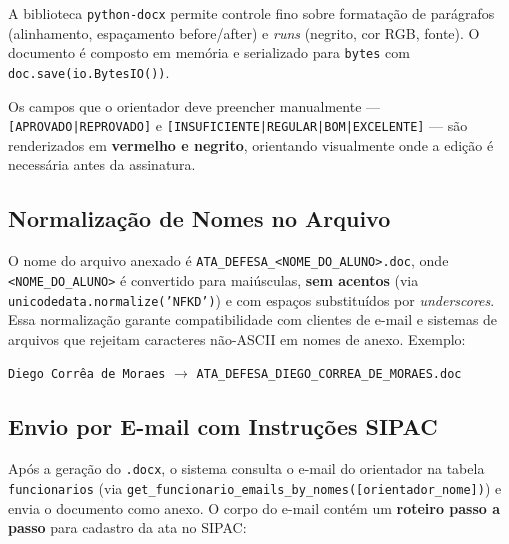 \documentclass[12pt,a4paper]{report}
\begin{document}
A biblioteca \texttt{python-docx} permite controle fino sobre formatação de
parágrafos (alinhamento, espaçamento before/after) e \textit{runs} (negrito,
cor RGB, fonte). O documento é composto em memória e serializado para
\texttt{bytes} com \texttt{doc.save(io.BytesIO())}.

\begin{insight}[title=Campos editáveis destacados em vermelho]
Os campos que o orientador deve preencher manualmente ---
\texttt{[APROVADO|REPROVADO]} e \texttt{[INSUFICIENTE|REGULAR|BOM|EXCELENTE]}
--- são renderizados em \textbf{vermelho e negrito}, orientando visualmente
onde a edição é necessária antes da assinatura.
\end{insight}

\subsection{Normalização de Nomes no Arquivo}

O nome do arquivo anexado é \texttt{ATA\_DEFESA\_<NOME\_DO\_ALUNO>.doc}, onde
\texttt{<NOME\_DO\_ALUNO>} é convertido para maiúsculas, \textbf{sem acentos}
(via \texttt{unicodedata.normalize('NFKD')}) e com espaços substituídos por
\textit{underscores}. Essa normalização garante compatibilidade com clientes de
e-mail e sistemas de arquivos que rejeitam caracteres não-ASCII em nomes de
anexo. Exemplo:

\begin{center}
\texttt{Diego Corrêa de Moraes} $\to$ \texttt{ATA\_DEFESA\_DIEGO\_CORREA\_DE\_MORAES.doc}
\end{center}

\subsection{Envio por E-mail com Instruções SIPAC}

Após a geração do \texttt{.docx}, o sistema consulta o e-mail do orientador na
tabela \texttt{funcionarios} (via
\texttt{get\_funcionario\_emails\_by\_nomes([orientador\_nome])}) e envia o
documento como anexo. O corpo do e-mail contém um \textbf{roteiro passo a
passo} para cadastro da ata no SIPAC:
\end{document}
